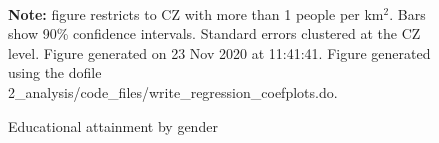 \begin{figure}[!h]
\centering
\caption{Educational attainment by gender}
\label{figure:education_shares}
  \\ 
\par \begin{minipage}[h]{\textwidth}{\tiny\textbf{Note:} figure restricts to CZ with more than 1 people per km$^2$. Bars show 90\% confidence intervals. Standard errors clustered at the CZ level. Figure generated on 23 Nov 2020 at 11:41:41. Figure generated using the dofile 2\_analysis/code\_files/write\_regression\_coefplots.do.}\end{minipage}
\end{figure}
